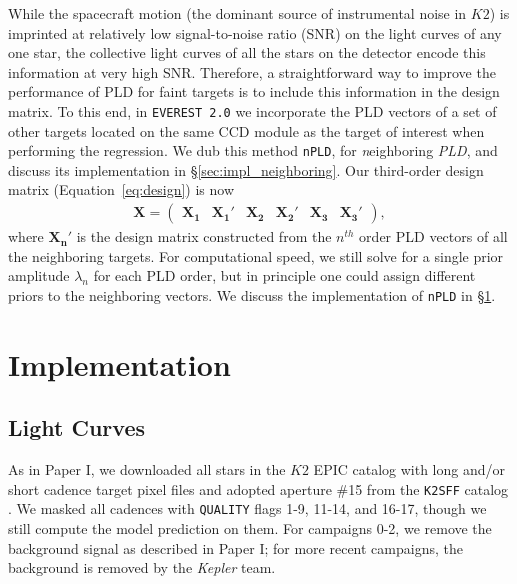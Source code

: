 \documentclass[]{emulateapj}
\begin{document}
While the spacecraft motion (the dominant source of instrumental noise in $K2$) is imprinted at relatively 
low signal-to-noise ratio (SNR) on the light curves
of any one star, the collective light curves of all the stars on the detector encode
this information at very high SNR. Therefore, a straightforward way to improve the performance of PLD
for faint targets is to include this information in the design matrix. To this end, in \texttt{EVEREST 2.0} we
incorporate the PLD vectors of a set of other targets located on the same CCD module as the target of interest
when performing the regression.
We dub
this method \texttt{nPLD}, for \emph{n}eighboring
\emph{PLD}, and discuss its implementation in \S\ref{sec:impl_neighboring}. Our third-order design 
matrix (Equation~\ref{eq:design}) is now
%
\begin{align}
\label{eq:design_nPLD}
\mathbf{X} = 
\left(
\begin{array}{cccccc}
  \mathbf{X_1} & \mathbf{X_1'} & \mathbf{X_2} & \mathbf{X_2'} & \mathbf{X_3} & \mathbf{X_3'}
\end{array}
\right),
\end{align}
%
where $\mathbf{X_n'}$ is the design matrix constructed from the $n^{th}$ order PLD vectors of all the 
neighboring targets. For computational speed, we still solve for a single prior amplitude $\lambda_n$ 
for each PLD order, but in principle one could assign different priors to the neighboring vectors. We
discuss the implementation of \texttt{nPLD} in \S\ref{sec:implementation}.

\section{Implementation}
\label{sec:implementation}

\subsection{Light Curves}
\label{sec:impl_lightcurves}
As in Paper I, we downloaded all stars in the $K2$ EPIC catalog with long and/or short cadence
target pixel files and adopted aperture \#15
from the \texttt{K2SFF} catalog \citep{Vanderburg14,VanderburgJohnson14}. We masked all
cadences with \texttt{QUALITY} flags 1-9, 11-14, and 16-17, though we still compute the
model prediction on them. For campaigns 0-2, we remove the background signal as 
described in Paper I; for more recent campaigns, the background is removed by the \emph{Kepler}
team.
\end{document}
